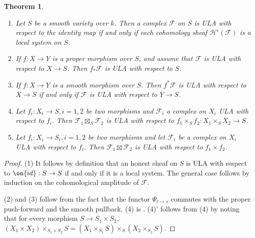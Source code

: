 \documentclass[]{pcmi}
\theoremstyle{plain}
\newtheorem{thm}[equation]{Theorem}
\theoremstyle{remark}
\theoremstyle{definition}
\newcommand{\mF}{{\mathcal F}}
\newcommand{\mH}{{\mathcal H}}
\newcommand{\id}{{\on{id}}}
\begin{document}
\begin{thm}\label{ULA prop}~
\begin{enumerate}
\item Let $S$ be a smooth variety over $k$. Then a complex $\mF$ on $S$ is ULA with respect to the identity map if and only if each cohomology sheaf $\mH^i(\mF)$ is a local system on $S$.
 
\item If $f:X\to Y$ is a proper morphism over $S$, and assume that $\mF$ is ULA with respect to $X\to S$. Then $f_*\mF$ is ULA with respect to $S$.

\item If $f:X\to Y$ is a smooth morphism over $S$. Then $f^*\mF$ is ULA with respect to $X\to S$ if and only if $\mF$ is ULA with respect to $Y\to S$.

\item Let $f_i:X_i\to S, i=1,2$ be two morphisms and $\mF_i$ a complex on $X_i$ ULA with respect to $f_i$. Then $\mF_1\boxtimes_S\mF_2$ is ULA with respect to $f_1\times_Sf_2:X_1\times_SX_2\to S$.

\item[(4)'] Let $f_i:X_i\to S_i, i=1,2$ be two morphisms and let $\mF_i$ be a complex on $X_i$ ULA with respect to $f_i$. Then $\mF_1\boxtimes\mF_2$ is ULA with respect to $f_1\times f_2$.
\end{enumerate}
\end{thm}
\begin{proof} 
(1) It follows by definition that an honest sheaf on $S$ is ULA with respect to $\id:S\to S$ if and only if it is a local system. The general case follows by induction on the cohomological amplitude of $\mF$.

(2) and (3) follow from the fact that the functor
$\Psi_{t\to s}$ commutes with the proper push-forward and the smooth pullback.
(4) is \cite[Corollary 2.5]{Il3}. (4)' follows from (4) by noting that for every morphism $S\to S_1\times S_2$, $(X_1\times X_2)\times_{S_1\times S_2}S=(X_1\times_{S_1}S)\times_S(X_2\times_{S_2}S)$.
\end{proof}
\end{document}
